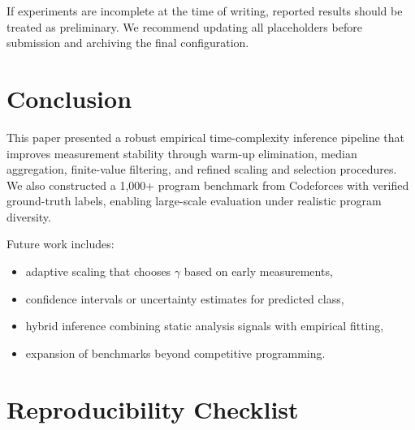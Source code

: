 \documentclass[conference]{IEEEtran}
\begin{document}
If experiments are incomplete at the time of writing, reported results should be
treated as preliminary.
We recommend updating all placeholders before submission and archiving the final
configuration.

\section{Conclusion}
\label{sec:conclusion}

This paper presented a robust empirical time-complexity inference pipeline that
improves measurement stability through warm-up elimination, median aggregation,
finite-value filtering, and refined scaling and selection procedures.
We also constructed a 1,000+ program benchmark from Codeforces with verified
ground-truth labels, enabling large-scale evaluation under realistic program
diversity.

Future work includes:
\begin{itemize}[leftmargin=1.2em]
\item adaptive scaling that chooses $\gamma$ based on early measurements,
\item confidence intervals or uncertainty estimates for predicted class,
\item hybrid inference combining static analysis signals with empirical fitting,
\item expansion of benchmarks beyond competitive programming.
\end{itemize}




\appendices

\section{Reproducibility Checklist}
\end{document}
